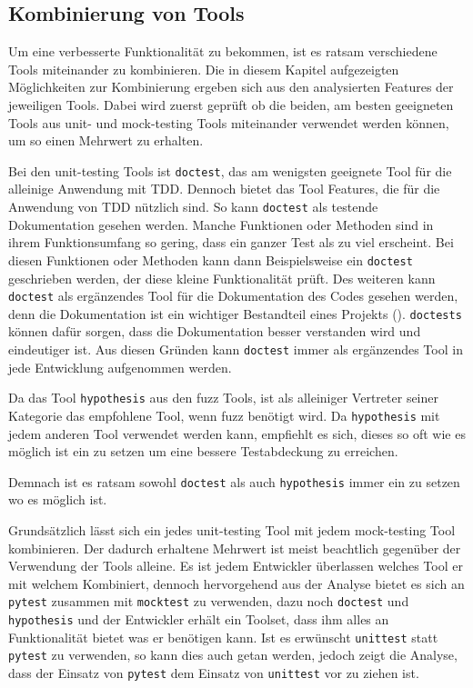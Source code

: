 \subsection{Kombinierung von Tools}\label{python-tools:kombination}
Um eine verbesserte Funktionalität zu bekommen, ist es ratsam verschiedene
Tools miteinander zu kombinieren. Die in diesem Kapitel aufgezeigten
Möglichkeiten zur Kombinierung ergeben sich aus den analysierten Features der
jeweiligen Tools. Dabei wird zuerst geprüft ob die beiden, am besten geeigneten
Tools aus unit- und \gls{mock}-testing Tools miteinander verwendet werden
können, um so einen Mehrwert zu erhalten.

Bei den unit-testing Tools ist \lstinline{doctest}, das am wenigsten geeignete
Tool für die alleinige Anwendung mit TDD. Dennoch bietet das Tool Features, die
für die Anwendung von TDD nützlich sind. So kann \lstinline{doctest} als
testende Dokumentation gesehen werden. Manche Funktionen oder Methoden sind in
ihrem Funktionsumfang so gering, dass ein ganzer Test als zu viel erscheint.
Bei diesen Funktionen oder Methoden kann dann Beispielsweise ein
\lstinline{doctest} geschrieben werden, der diese kleine Funktionalität prüft.
Des weiteren kann \lstinline{doctest} als ergänzendes Tool für die
Dokumentation des Codes gesehen werden, denn die Dokumentation ist ein
wichtiger Bestandteil eines Projekts (\cite{python.org:PEP8}).
\lstinline{doctests} können dafür sorgen, dass die Dokumentation besser
verstanden wird und eindeutiger ist. Aus diesen Gründen kann
\lstinline{doctest} immer als ergänzendes Tool in jede Entwicklung aufgenommen
werden.

Da das Tool \lstinline{hypothesis} aus den \gls{fuzz} Tools, ist als alleiniger
Vertreter seiner Kategorie das empfohlene Tool, wenn \gls{fuzz} benötigt wird.
Da \lstinline{hypothesis} mit jedem anderen Tool verwendet werden kann,
empfiehlt es sich, dieses so oft wie es möglich ist ein zu setzen um eine
bessere Testabdeckung zu erreichen.

Demnach ist es ratsam sowohl \lstinline{doctest} als auch
\lstinline{hypothesis} immer ein zu setzen wo es möglich ist.
\newline

Grundsätzlich lässt sich ein jedes unit-testing Tool mit jedem 
\gls{mock}-testing Tool kombinieren. Der dadurch erhaltene Mehrwert ist meist 
beachtlich gegenüber der Verwendung der Tools alleine. Es ist jedem Entwickler 
überlassen welches Tool er mit welchem Kombiniert, dennoch hervorgehend aus der 
Analyse bietet es sich an \lstinline{pytest} zusammen mit \lstinline{mocktest} 
zu verwenden, dazu noch \lstinline{doctest} und \lstinline{hypothesis} und der 
Entwickler erhält ein Toolset, dass ihm alles an Funktionalität bietet was er 
benötigen kann. Ist es erwünscht \lstinline{unittest} statt \lstinline{pytest} 
zu verwenden, so kann dies auch getan werden, jedoch zeigt die Analyse, dass 
der Einsatz von \lstinline{pytest} dem Einsatz von \lstinline{unittest} vor zu 
ziehen ist.